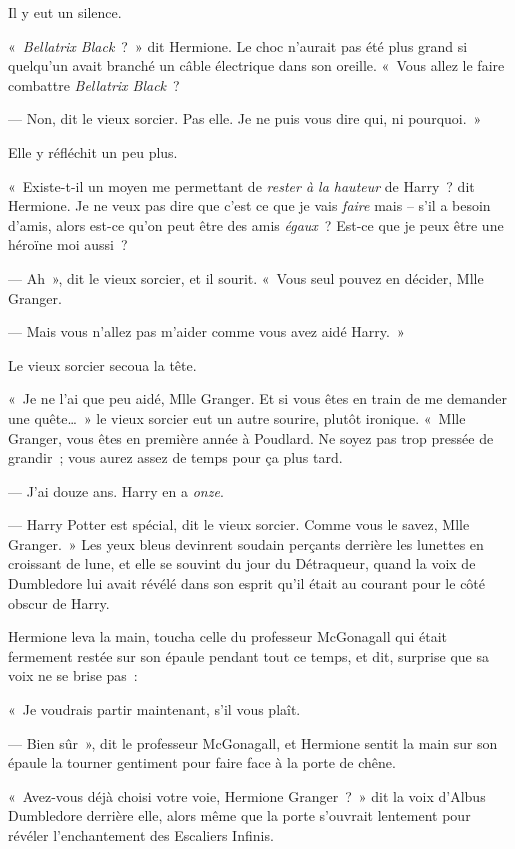 Il y eut un silence.

«~\emph{Bellatrix Black}~?~» dit Hermione. Le choc n'aurait pas été plus grand si quelqu'un avait branché un câble électrique dans son oreille. «~Vous allez le faire combattre \emph{Bellatrix Black}~?

--- Non, dit le vieux sorcier. Pas elle. Je ne puis vous dire qui, ni pourquoi.~»

Elle y réfléchit un peu plus.

«~Existe-t-il un moyen me permettant de \emph{rester à la hauteur} de Harry~? dit Hermione. Je ne veux pas dire que c'est ce que je vais \emph{faire} mais -- s'il a besoin d'amis, alors est-ce qu'on peut être des amis \emph{égaux}~? Est-ce que je peux être une héroïne moi aussi~?

--- Ah~», dit le vieux sorcier, et il sourit. «~Vous seul pouvez en décider, Mlle Granger.

--- Mais vous n'allez pas m'aider comme vous avez aidé Harry.~»

Le vieux sorcier secoua la tête.

«~Je ne l'ai que peu aidé, Mlle Granger. Et si vous êtes en train de me demander une quête…~» le vieux sorcier eut un autre sourire, plutôt ironique. «~Mlle Granger, vous êtes en première année à Poudlard. Ne soyez pas trop pressée de grandir~; vous aurez assez de temps pour ça plus tard.

--- J'ai douze ans. Harry en a \emph{onze}.

--- Harry Potter est spécial, dit le vieux sorcier. Comme vous le savez, Mlle Granger.~» Les yeux bleus devinrent soudain perçants derrière les lunettes en croissant de lune, et elle se souvint du jour du Détraqueur, quand la voix de Dumbledore lui avait révélé dans son esprit qu'il était au courant pour le côté obscur de Harry.

Hermione leva la main, toucha celle du professeur McGonagall qui était fermement restée sur son épaule pendant tout ce temps, et dit, surprise que sa voix ne se brise pas~:

«~Je voudrais partir maintenant, s'il vous plaît.

--- Bien sûr~», dit le professeur McGonagall, et Hermione sentit la main sur son épaule la tourner gentiment pour faire face à la porte de chêne.

«~Avez-vous déjà choisi votre voie, Hermione Granger~?~» dit la voix d'Albus Dumbledore derrière elle, alors même que la porte s'ouvrait lentement pour révéler l'enchantement des Escaliers Infinis.

